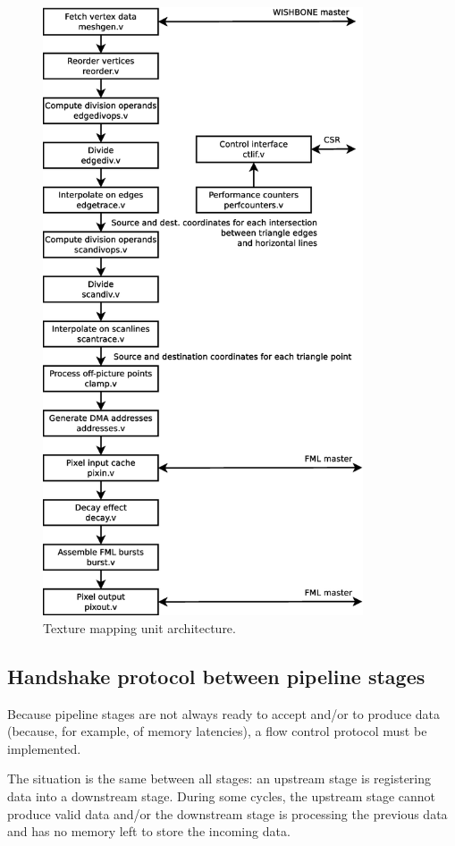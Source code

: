 \documentclass[a4paper,11pt]{article}
\begin{document}
\begin{figure}[H]
\centering
\includegraphics[height=180mm]{architecture.eps}
\caption{Texture mapping unit architecture.}\label{fig:architecture}
\end{figure}

\subsection{Handshake protocol between pipeline stages}
Because pipeline stages are not always ready to accept and/or to produce data (because, for example, of memory latencies), a flow control protocol must be implemented.

The situation is the same between all stages: an upstream stage is registering data into a downstream stage. During some cycles, the upstream stage cannot produce valid data and/or the downstream stage is processing the previous data and has no memory left to store the incoming data.
\end{document}
